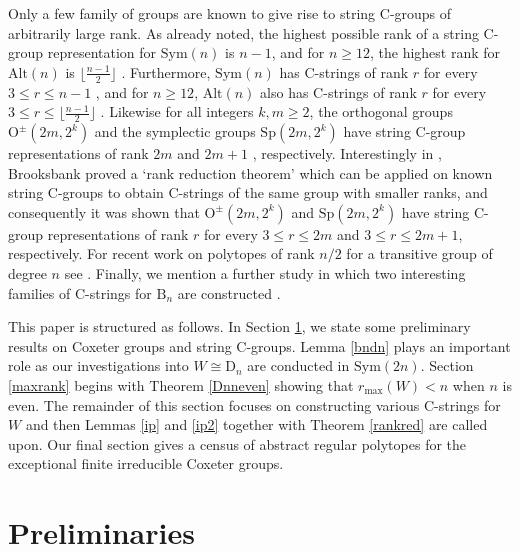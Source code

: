\documentclass{amsart}
\numberwithin{equation}{section}
\theoremstyle{plain} %
\begin{document}
Only a few family of groups are known to give rise to string C-groups of arbitrarily large rank.  As already noted, the highest possible rank of a string C-group representation for $\mathrm{Sym}(n)$  is $n-1$, and for $n \ge 12$, the highest rank for $\mathrm{Alt}(n)$ is $\lfloor{\frac{n-1}{2}}\rfloor$ \cite{altrank}. Furthermore, $\mathrm{Sym}(n)$ has C-strings of rank $r$ for every $3 \leq r \leq n-1$ \cite{p20}, and for $n \ge 12$, $\mathrm{Alt}(n)$ also has C-strings of rank $r$ for every $3 \leq r \leq \lfloor{\frac{n-1}{2}}\rfloor$ \cite{p22}. Likewise for all integers $k,m \ge 2$, the orthogonal groups $\mathrm{O}^{\pm}(2m,2^k)$ and the symplectic groups $\mathrm{Sp}(2m,2^k)$ have string C-group representations of rank $2m$ and $2m+1$ \cite{p2}, respectively. Interestingly in \cite{rankred}, Brooksbank proved a `rank reduction theorem' which can be applied on known string C-groups to obtain C-strings of the same group with smaller ranks, and consequently it was shown that $\mathrm{O}^{\pm}(2m,2^k)$ and $\mathrm{Sp}(2m,2^k)$ have string C-group representations of rank $r$ for every $3 \leq r \leq 2m$ and $3 \leq r \leq 2m+1$, respectively. For recent work on polytopes of rank $n/2$ for a transitive group of degree $n$ see \cite{interesting}. Finally, we mention a further study in which two interesting families of C-strings for $\mathrm{B}_n$ are constructed \cite{unravelledbn}.


This paper is structured as follows. In Section \ref{pre}, we  state some preliminary results on Coxeter groups and string C-groups.  Lemma \ref{bndn} plays an important role as our investigations into $W \cong \mathrm{D}_n$ are conducted in $\mathrm{Sym}(2n)$. Section \ref{maxrank} begins with Theorem \ref{Dnneven} showing that $r_{\mathrm{max}}(W)  < n$ when $n$ is even. The remainder of this section focuses on constructing various C-strings for $W$ and then Lemmas \ref{ip} and \ref{ip2} together with Theorem \ref{rankred} are called upon. Our final section gives a census of abstract regular polytopes for the exceptional finite irreducible Coxeter groups.






\section{Preliminaries} \label{pre}
\end{document}
